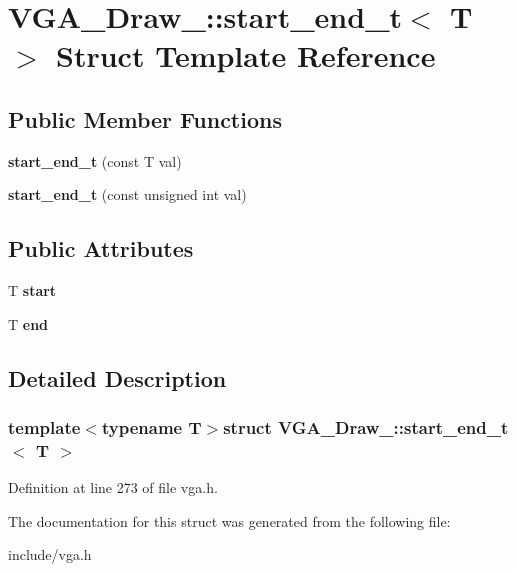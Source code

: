 \hypertarget{structVGA__Draw__2_1_1start__end__t}{\section{V\-G\-A\-\_\-\-Draw\-\_\-:\-:start\-\_\-end\-\_\-t$<$ T $>$ Struct Template Reference}
\label{structVGA__Draw__2_1_1start__end__t}
}
\subsection*{Public Member Functions}
\begin{DoxyCompactItemize}
\item 
\hypertarget{structVGA__Draw__2_1_1start__end__t_a6d9a56c9757f03722c83c26bd63fe110}{{\bfseries start\-\_\-end\-\_\-t} (const T val)}\label{structVGA__Draw__2_1_1start__end__t_a6d9a56c9757f03722c83c26bd63fe110}

\item 
\hypertarget{structVGA__Draw__2_1_1start__end__t_af80453473cb5f421307a76bbe4b2421e}{{\bfseries start\-\_\-end\-\_\-t} (const unsigned int val)}\label{structVGA__Draw__2_1_1start__end__t_af80453473cb5f421307a76bbe4b2421e}

\end{DoxyCompactItemize}
\subsection*{Public Attributes}
\begin{DoxyCompactItemize}
\item 
\hypertarget{structVGA__Draw__2_1_1start__end__t_a585ddb518c0b713ba51c33d9b467d7a0}{T {\bfseries start}}\label{structVGA__Draw__2_1_1start__end__t_a585ddb518c0b713ba51c33d9b467d7a0}

\item 
\hypertarget{structVGA__Draw__2_1_1start__end__t_a2fa806eece1417942f00fa327cbae88e}{T {\bfseries end}}\label{structVGA__Draw__2_1_1start__end__t_a2fa806eece1417942f00fa327cbae88e}

\end{DoxyCompactItemize}


\subsection{Detailed Description}
\subsubsection*{template$<$typename T$>$struct V\-G\-A\-\_\-\-Draw\-\_\-::start\-\_\-end\-\_\-t$<$ T $>$}



Definition at line 273 of file vga.\-h.



The documentation for this struct was generated from the following file\-:\begin{DoxyCompactItemize}
\item 
include/vga.\-h\end{DoxyCompactItemize}
